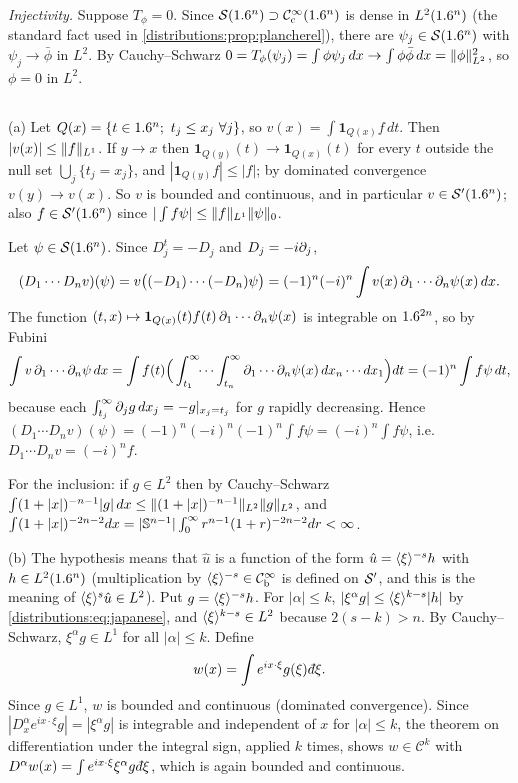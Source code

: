 \emph{Injectivity.} Suppose $T_\phi=0$. Since $\mathcal{S}(1.6^n)\supset\mathcal{C}^\infty_{\mathrm{c}}(1.6^n)$ is dense in
$L^2(1.6^n)$ (the standard fact used in \cref{distributions:prop:plancherel}), there are
$\psi_j\in\mathcal{S}(1.6^n)$ with $\psi_j\to\bar\phi$ in $L^2$. By Cauchy--Schwarz
$0=T_\phi(\psi_j)=\int\phi\psi_j\,dx\to\int\phi\bar\phi\,dx=\lVert \phi\rVert^2_{L^2}$, so
$\phi=0$ in $L^2$.

\subsection*{}
(a) Let $Q(x)=\{t\in\R^n;\ t_j\le x_j\ \forall j\}$, so $v(x)=\int\mathbf 1_{Q(x)}f\,dt$.
Then $|v(x)|\le\lVert f\rVert_{L^1}$. If $y\to x$ then $\mathbf 1_{Q(y)}(t)\to\mathbf 1_{Q(x)}(t)$
for every $t$ outside the null set $\bigcup_j\{t_j=x_j\}$, and $|\mathbf 1_{Q(y)}f|\le|f|$;
by dominated convergence $v(y)\to v(x)$. So $v$ is bounded and continuous, and in
particular $v\in\mathcal{S}'(1.6^n)$; also $f\in\mathcal{S}'(1.6^n)$ since $|\int f\psi|\le\lVert f\rVert_{L^1}\lVert \psi\rVert_0$.

Let $\psi\in\mathcal{S}(1.6^n)$. Since $D_j^t=-D_j$ and $D_j=-i\partial_j$,
\[
  (D_1\cdots D_nv)(\psi)=v\big((-D_1)\cdots(-D_n)\psi\big)
  =(-1)^n(-i)^n\int v(x)\,\partial_1\cdots\partial_n\psi(x)\,dx.
\]
The function $(t,x)\mapsto\mathbf 1_{Q(x)}(t)f(t)\,\partial_1\cdots\partial_n\psi(x)$ is integrable
on $1.6^{2n}$, so by Fubini
\[
  \int v\,\partial_1\cdots\partial_n\psi\,dx=\int f(t)\Big(\int_{t_1}^\infty\!\!\cdots\int_{t_n}^\infty
  \partial_1\cdots\partial_n\psi(x)\,dx_n\cdots dx_1\Big)dt=(-1)^n\int f\psi\,dt,
\]
because each $\int_{t_j}^\infty\partial_jg\,dx_j=-g|_{x_j=t_j}$ for $g$ rapidly decreasing.
Hence $(D_1\cdots D_nv)(\psi)=(-1)^n(-i)^n(-1)^n\int f\psi=(-i)^n\int f\psi$, i.e.\
$D_1\cdots D_nv=(-i)^nf$.

For the inclusion: if $g\in L^2$ then by Cauchy--Schwarz
$\int(1+|x|)^{-n-1}|g|\,dx\le\lVert (1+|x|)^{-n-1}\rVert_{L^2}\lVert g\rVert_{L^2}$, and
$\int(1+|x|)^{-2n-2}dx=|\mathbb{S}^{n-1}|\int_0^\infty r^{n-1}(1+r)^{-2n-2}dr<\infty$.

(b) The hypothesis means that $\hat u$ is a function of the form
$\hat u=\langle \xi\rangle^{-s}h$ with $h\in L^2(1.6^n)$ (multiplication by $\langle \xi\rangle^{-s}\in\mathcal{C}^\infty_{\mathrm{b}}$
is defined on $\mathcal{S}'$, and this is the meaning of $\langle \xi\rangle^s\hat u\in L^2$). Put
$g=\langle \xi\rangle^{-s}h$. For $|\alpha|\le k$, $|\xi^\alpha g|\le\langle \xi\rangle^{k-s}|h|$ by
\eqref{distributions:eq:japanese}, and $\langle \xi\rangle^{k-s}\in L^2$ because $2(s-k)>n$.
By Cauchy--Schwarz, $\xi^\alpha g\in L^1$ for all $|\alpha|\le k$. Define
\[
  w(x)=\int e^{ix\cdot\xi}g(\xi)\,\dbar\xi .
\]
Since $g\in L^1$, $w$ is bounded and continuous (dominated convergence). Since
$|D_x^\alpha e^{ix\cdot\xi}g|=|\xi^\alpha g|$ is integrable and independent of $x$ for
$|\alpha|\le k$, the theorem on differentiation under the integral sign, applied $k$ times,
shows $w\in\mathcal{C}^k$ with $D^\alpha w(x)=\int e^{ix\cdot\xi}\xi^\alpha g\,\dbar\xi$,
which is again bounded and continuous.

